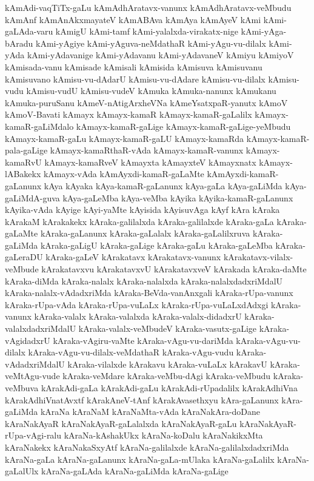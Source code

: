 {kAmAdi-vaqTiTx-gaLu
kAmAdhAratavx-vanunx
kAmAdhAratavx-veMbudu
kAmAnf
kAmAnAkxmayateV
kAmABAva
kAmAya
kAmAyeV
kAmi
kAmi-gaLAda-varu
kAmigU
kAmi-tamf
kAmi-yalalxda-virakatx-nige
kAmi-yAga-bAradu
kAmi-yAgiye
kAmi-yAguva-neMdathaR
kAmi-yAgu-vu-dilalx
kAmi-yAda
kAmi-yAdavanige
kAmi-yAdavanu
kAmi-yAdavaneV
kAmiyu
kAmiyoV
kAmisada-vanu
kAmisade
kAmisali
kAmisida
kAmisuva
kAmisuvanu
kAmisuvano
kAmisu-vu-dAdarU
kAmisu-vu-dAdare
kAmisu-vu-dilalx
kAmisu-vudu
kAmisu-vudU
kAmisu-vudeV
kAmuka
kAmuka-nanunx
kAmukanu
kAmuka-puruSanu
kAmeV-nAtigArxheVNa
kAmeYsatxpaR-yanutx
kAmoV
kAmoV-Bavati
kAmayx
kAmayx-kamaR
kAmayx-kamaR-gaLalilx
kAmayx-kamaR-gaLiMdalo
kAmayx-kamaR-gaLige
kAmayx-kamaR-gaLige-yeMbudu
kAmayx-kamaR-gaLu
kAmayx-kamaR-gaLU
kAmayx-kamaRda
kAmayx-kamaR-pala-gaLige
kAmayx-kamaRthaR-vAda
kAmayx-kamaR-vanunx
kAmayx-kamaRvU
kAmayx-kamaRveV
kAmayxta
kAmayxteV
kAmayxnatx
kAmayx-lABakekx
kAmayx-vAda
kAmAyxdi-kamaR-gaLaMte
kAmAyxdi-kamaR-gaLanunx
kAya
kAyaka
kAya-kamaR-gaLanunx
kAya-gaLa
kAya-gaLiMda
kAya-gaLiMdA-guva
kAya-gaLeMba
kAya-veMba
kAyika
kAyika-kamaR-gaLanunx
kAyika-vAda
kAyige
kAyi-yaMte
kAyisida
kAyisuvAga
kAyf
kAra
kAraka
kArakaM
kArakakekx
kAraka-galilalxda
kAraka-galilalxde
kAraka-gaLa
kAraka-gaLaMte
kAraka-gaLanunx
kAraka-gaLalalx
kAraka-gaLalilxruva
kAraka-gaLiMda
kAraka-gaLigU
kAraka-gaLige
kAraka-gaLu
kAraka-gaLeMba
kAraka-gaLeraDU
kAraka-gaLeV
kArakatavx
kArakatavx-vanunx
kArakatavx-vilalx-veMbude
kArakatavxvu
kArakatavxvU
kArakatavxveV
kArakada
kAraka-daMte
kAraka-diMda
kAraka-nalalx
kAraka-nalalxda
kAraka-nalalxdadxriMdalU
kAraka-nalalx-vAdadxriMda
kAraka-BeVda-vanAnxgali
kAraka-rUpa-vanunx
kAraka-rUpa-vAda
kAraka-rUpa-vuLaLx
kAraka-rUpa-vuLaLxdAdxgi
kAraka-vanunx
kAraka-valalx
kAraka-valalxda
kAraka-valalx-didadxrU
kAraka-valalxdadxriMdalU
kAraka-valalx-veMbudeV
kAraka-vasutx-gaLige
kAraka-vAgidadxrU
kAraka-vAgiru-vaMte
kAraka-vAgu-vu-dariMda
kAraka-vAgu-vu-dilalx
kAraka-vAgu-vu-dilalx-veMdathaR
kAraka-vAgu-vudu
kAraka-vAdadxriMdalU
kAraka-vilalxde
kArakavu
kAraka-vuLaLx
kArakavU
kAraka-veMtAgu-vude
kAraka-veMdare
kAraka-veMbu-dAgi
kAraka-veMbudu
kAraka-veMbuva
kArakAdi-gaLa
kArakAdi-gaLu
kArakAdi-rUpadalilx
kArakAdhiVna
kArakAdhiVnatAvxtf
kArakAneV-tAnf
kArakAvasethxyu
kAra-gaLanunx
kAra-gaLiMda
kAraNa
kAraNaM
kAraNaMta-vAda
kAraNakAra-doDane
kAraNakAyaR
kAraNakAyaR-gaLalalxda
kAraNakAyaR-gaLu
kAraNakAyaR-rUpa-vAgi-ralu
kAraNa-kAshakUkx
kAraNa-koDalu
kAraNakikxMta
kAraNakekx
kAraNakaSxyAtf
kAraNa-galilalxde
kAraNa-galilalxdadxriMda
kAraNa-gaLa
kAraNa-gaLanunx
kAraNa-gaLa-mUlaka
kAraNa-gaLalilx
kAraNa-gaLalUlx
kAraNa-gaLAda
kAraNa-gaLiMda
kAraNa-gaLige
}
